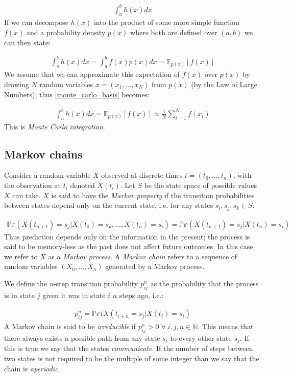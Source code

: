 \documentclass[11pt]{article} %
\begin{document}
\begin{align}
\int_a^b h(x) dx
\end{align}
If we can decompose $h(x)$ into the product of some more simple function $f(x)$ and a probability density $p(x)$ where both are defined over $(a,b)$ we can then state:

\begin{align} \label{monte_carlo_basis}
\int_a^bh(x)dx = \int_a^bf(x)p(x)dx = \mathbb{E}_{p(x)}\left[f(x)\right]
\end{align}
We assume that we can approximate this expectation of $f(x)$ over $p(x)$ by drawing $N$ random variables $x = (x_1,\ldots,x_N)$ from $p(x)$ (by the Law of Large Numbers); thus \eqref{monte_carlo_basis} becomes:

\begin{align} \label{monte_carlo_integration}
\int_a^bh(x)dx = \mathbb{E}_{p(x)}\left[f(x)\right] \approx \frac{1}{N}\sum_{i=1}^Nf(x_i)
\end{align}
This is \emph{Monte Carlo integration}.

\subsection{Markov chains}
Consider a random variable $X$ observed at discrete times $t = (t_0,\ldots,t_n)$, with the observation at $t_i$ denoted $X(t_i)$. Let $S$ be the state space of possible values $X$ can take. $X$ is said to have the \emph{Markov property} if the transition probabilities between states depend only on the current state, i.e. for any states $s_i, s_j, s_k \in S$:

\begin{align}
\mathbb{Pr}(X(t_{n+1}) = s_j | X(t_0) = s_k, \ldots, X(t_n) = s_i) = \mathbb{Pr}(X(t_{n+1}) = s_j | X(t_n) = s_i) 
\end{align}
Thus prediction depends only on the information in the present; the process is said to be memory-less as the past does not affect future outcomes. In this case we refer to $X$ as a \emph{Markov process}. A \emph{Markov chain} refers to a sequence of random variables $(X_0,\ldots,X_n)$ generated by a Markov process.

We define the $n$-step transition probability $p_{ij}^n$ as the probability that the process is in state $j$ given it was in state $i$ $n$ steps ago, i.e.:

\begin{align}
p_{ij}^n = \mathbb{Pr}(X(t_{i+n} = s_j | X(t_i) = s_i)
\end{align}
A Markov chain is said to be \emph{irreducible} if $p_{ij}^n > 0 \; \forall \; i,j,n \in \mathbb{N}$. This means that there always exists a possible path from any state $s_i$ to every other state $s_j$. If this is true we say that the states \emph{communicate}. If the number of steps between two states is not required to be the multiple of some integer than we say that the chain is \emph{aperiodic}.
\end{document}
